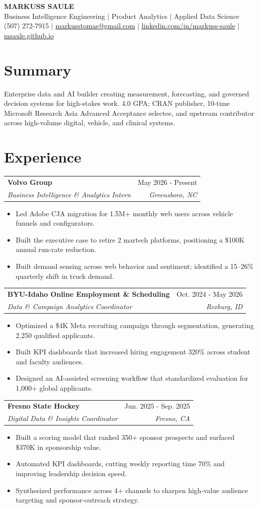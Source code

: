 \documentclass[letterpaper,10pt]{article}
\makeatletter
\newcommand{\role}[4]{%
  \vspace{4pt}
  \begin{tabular*}{\textwidth}{@{}l@{\extracolsep{\fill}}r@{}}
    \textbf{#1} & \textcolor{meta}{#2} \\
    \textit{#3} & \textit{\textcolor{meta}{#4}} \\
  \end{tabular*}\vspace{-2pt}
}
\newcommand{\bulletlist}{%
  \begin{itemize}[
    leftmargin=0.17in,
    label={\raisebox{0.15ex}{\small -}},
    itemsep=2.1pt,
    topsep=2pt,
    parsep=0pt,
    partopsep=0pt
  ]
}
\newcommand{\bulletlistend}{\end{itemize}\vspace{3.5pt}}
\newcommand{\rbullet}[1]{\item \fontsize{9.6}{12.1}\selectfont #1}
\newcommand{\compactline}[1]{{\fontsize{9.65}{12.2}\selectfont #1}}
\makeatother
\begin{document}
\begin{center}
  {\fontsize{22}{24}\selectfont\bfseries MARKUSS SAULE}\\[2.5pt]
  {\fontsize{10}{11}\selectfont Business Intelligence Engineering $\mid$ Product Analytics $\mid$ Applied Data Science}\\[2.4pt]
  {\fontsize{9.3}{10.5}\selectfont
    (507) 272-7915 $\mid$
    \href{mailto:markusstomas@gmail.com}{markusstomas@gmail.com} $\mid$
    \href{https://linkedin.com/in/markuss-saule}{linkedin.com/in/markuss-saule} $\mid$
    \href{https://msaule.github.io}{msaule.github.io}}
\end{center}
\vspace{-4pt}

\section{Summary}
\compactline{Enterprise data and AI builder creating measurement, forecasting, and governed decision systems for high-stakes work. 4.0 GPA; CRAN publisher, 10-time Microsoft Research Asia Advanced Acceptance selectee, and upstream contributor across high-volume digital, vehicle, and clinical systems.}

\section{Experience}
\role{Volvo Group}{May 2026 - Present}{Business Intelligence \& Analytics Intern}{Greensboro, NC}
\bulletlist
\rbullet{Led Adobe CJA migration for 1.5M+ monthly web users across vehicle funnels and configurators.}
\rbullet{Built the executive case to retire 2 martech platforms, positioning a \$100K annual run-rate reduction.}
\rbullet{Built demand sensing across web behavior and sentiment; identified a 15--26\% quarterly shift in truck demand.}
\bulletlistend

\role{BYU-Idaho Online Employment \& Scheduling}{Oct. 2024 - May 2026}{Data \& Campaign Analytics Coordinator}{Rexburg, ID}
\bulletlist
\rbullet{Optimized a \$4K Meta recruiting campaign through segmentation, generating 2,250 qualified applicants.}
\rbullet{Built KPI dashboards that increased hiring engagement 320\% across student and faculty audiences.}
\rbullet{Designed an AI-assisted screening workflow that standardized evaluation for 1,000+ global applicants.}
\bulletlistend

\role{Fresno State Hockey}{Jun. 2025 - Sep. 2025}{Digital Data \& Insights Coordinator}{Fresno, CA}
\bulletlist
\rbullet{Built a scoring model that ranked 350+ sponsor prospects and surfaced \$370K in sponsorship value.}
\rbullet{Automated KPI dashboards, cutting weekly reporting time 70\% and improving leadership decision speed.}
\rbullet{Synthesized performance across 4+ channels to sharpen high-value audience targeting and sponsor-outreach strategy.}
\bulletlistend
\end{document}
